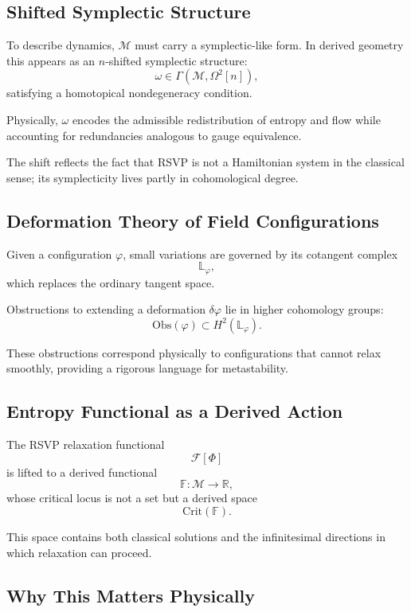\documentclass[12pt]{article}
\begin{document}
\subsection{Shifted Symplectic Structure}

To describe dynamics, $\mathcal{M}$ must carry a symplectic-like form. In derived geometry this appears as an $n$-shifted symplectic structure:
\[
\omega \in \Gamma(\mathcal{M}, \Omega^2[n]),
\]
satisfying a homotopical nondegeneracy condition.

Physically, $\omega$ encodes the admissible redistribution of entropy and flow while accounting for redundancies analogous to gauge equivalence.

The shift reflects the fact that RSVP is not a Hamiltonian system in the classical sense; its symplecticity lives partly in cohomological degree.

\subsection{Deformation Theory of Field Configurations}

Given a configuration $\varphi$, small variations are governed by its cotangent complex
\[
\mathbb{L}_\varphi,
\]
which replaces the ordinary tangent space.

Obstructions to extending a deformation $\delta\varphi$ lie in higher cohomology groups:
\[
\mathrm{Obs}(\varphi) \subset H^2(\mathbb{L}_\varphi).
\]

These obstructions correspond physically to configurations that cannot relax smoothly, providing a rigorous language for metastability.

\subsection{Entropy Functional as a Derived Action}

The RSVP relaxation functional
\[
\mathcal{F}[\Phi]
\]
is lifted to a derived functional
\[
\mathbb{F} : \mathcal{M} \to \mathbb{R},
\]
whose critical locus is not a set but a derived space
\[
\mathrm{Crit}(\mathbb{F}).
\]

This space contains both classical solutions and the infinitesimal directions in which relaxation can proceed.

\subsection{Why This Matters Physically}
\end{document}
